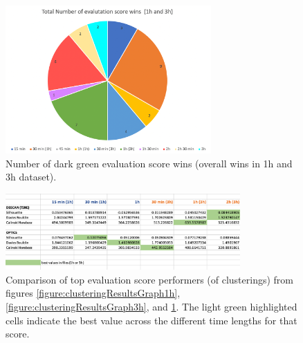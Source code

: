 \begin{figure}
  \centering
  \includegraphics[width=0.7\textwidth]{./images/clusteringResults/clusteringResultsGraphTotal.png}
  \caption{Number of dark green evaluation score wins (overall wins in 1h and 3h dataset).}
  \label{figure:clusteringResultsGraphTotal}
\end{figure}

\begin{figure}
  \centering
  \includegraphics[width=0.8\textwidth]{./images/clusteringResults/clusteringResults8.png}
  \caption{Comparison of top evaluation score performers (of clusterings) from figures \ref{figure:clusteringResultsGraph1h}, \ref{figure:clusteringResultsGraph3h}, and \ref{figure:clusteringResultsGraphTotal}. The light green highlighted cells indicate the best value across the different time lengths for that score.}
  \label{figure:clusteringResults8}
\end{figure}

\clearpage

